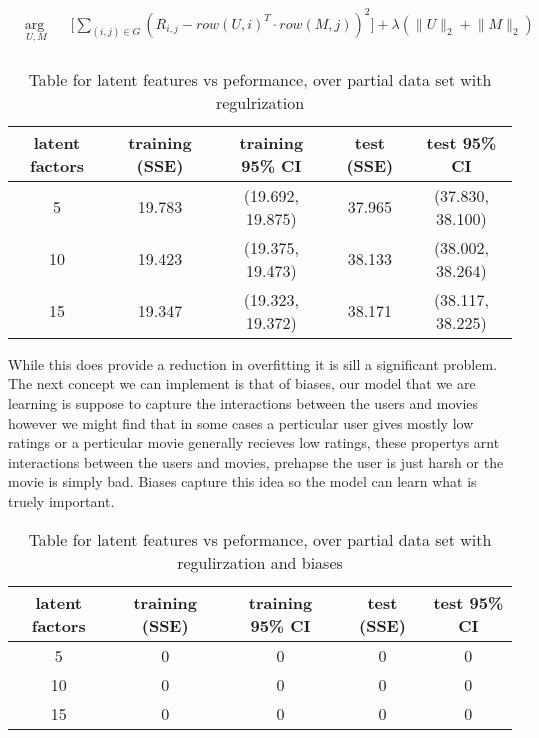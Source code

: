 \documentclass{article}
\begin{document}
\begin{equation*}
\begin{aligned}
& \underset{U, M}{\text{arg min}}
& & \big[ \sum_{(i,j) \in G} (R_{i,j} - row(U, i)^T \cdot row(M, j))^2 \big] + \lambda (\lVert U \lVert_2 + \lVert M \lVert_2)\\
\end{aligned}
\end{equation*}

\begin{table}[H]
\centering
\begin{tabular}{| c | c | c | c | c |}
\hline
latent factors & training (SSE) &  training 95\% CI & test (SSE) &  test 95\% CI  \\
\hline
\hline
5 & 19.783 & (19.692, 19.875)& 37.965 & (37.830, 38.100)\\
10 & 19.423 & (19.375, 19.473) & 38.133 & (38.002, 38.264)\\
15 & 19.347 & (19.323, 19.372) & 38.171 & (38.117, 38.225)\\
\hline
\end{tabular}
\caption{Table for latent features vs peformance, over partial data set with regulrization}
\end{table}

While this does provide a reduction in overfitting it is sill a significant problem. The next concept we can implement is that of biases, our model that we are learning is suppose to capture the interactions between the users and movies however we might find that in some cases a perticular user gives mostly low ratings or a perticular movie generally recieves low ratings, these propertys arnt interactions between the users and movies, prehapse the user is just harsh or the movie is simply bad. Biases capture this idea so the model can learn what is truely important.

\begin{table}[H]
\centering
\begin{tabular}{| c | c | c | c | c |}
\hline
latent factors & training (SSE) &  training 95\% CI & test (SSE) &  test 95\% CI  \\
\hline
\hline
5 & 0 & 0 & 0 & 0\\
10 & 0 & 0 & 0 & 0\\
15 & 0 & 0 & 0 & 0\\
\hline
\end{tabular}
\caption{Table for latent features vs peformance, over partial data set with regulirzation and biases}
\end{table}
\end{document}
